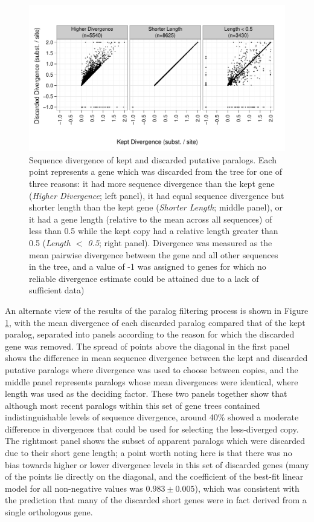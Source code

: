 \begin{figure}
\centering
\includegraphics[scale=0.7]{Figs/filtered_paralogs_scatter.pdf}
\caption{Sequence divergence of kept and discarded putative
  paralogs. Each point represents a gene which was discarded from the
  tree for one of three reasons: it had more sequence divergence than
  the kept gene (\emph{Higher Divergence}; left panel), it had equal
  sequence divergence but shorter length than the kept gene
  (\emph{Shorter Length}; middle panel), or it had a gene length
  (relative to the mean across all sequences) of less than 0.5 while
  the kept copy had a relative length greater than 0.5 (\emph{Length
    $<$ 0.5}; right panel). Divergence was measured as the mean
  pairwise divergence between the gene and all other sequences in the
  tree, and a value of -1 was assigned to genes for which no reliable
  divergence estimate could be attained due to a lack of sufficient
  data)}
\label{filtered_paralogs_scatter}
\end{figure}

An alternate view of the results of the paralog filtering process is
shown in Figure \ref{filtered_paralogs_scatter}, with the mean
divergence of each discarded paralog compared that of the kept
paralog, separated into panels according to the reason for which the
discarded gene was removed. The spread of points above the diagonal in
the first panel shows the difference in mean sequence divergence
between the kept and discarded putative paralogs where divergence was
used to choose between copies, and the middle panel represents
paralogs whose mean divergences were identical, where length was used
as the deciding factor. These two panels together show that although
most recent paralogs within this set of gene trees contained
indistinguishable levels of sequence divergence, around 40\% showed a
moderate difference in divergences that could be used for selecting
the less-diverged copy. The rightmost panel shows the subset of
apparent paralogs which were discarded due to their short gene length;
a point worth noting here is that there was no bias towards higher or
lower divergence levels in this set of discarded genes (many of the
points lie directly on the diagonal, and the coefficient of the
best-fit linear model for all non-negative values was $0.983 \pm
0.005$), which was consistent with the prediction that many of the
discarded short genes were in fact derived from a single orthologous
gene.

